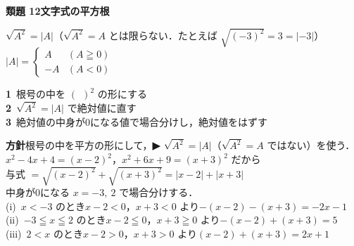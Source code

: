 \documentclass[a4paper,11pt]{ltjsarticle}
\newcommand{\ans}[2]{\Needspace{5\baselineskip}\vspace{6pt}%
  {\sffamily\bfseries 類題 #1\quad #2}\par}
\newcommand{\point}[1]{\textsf{\bfseries ▶ #1}}
\begin{document}
\ans{12}{文字式の平方根}
\begin{kai}
\begin{kakunin}
$\sqrt{A^2}=|A|$\quad（$\sqrt{A^2}=A$ とは限らない．たとえば $\sqrt{(-3)^2}=3=|-3|$）\\
$|A|=\begin{cases}A & (A\geqq0)\\ -A & (A<0)\end{cases}$
\end{kakunin}
\begin{steps}
\textbf{1}\ 根号の中を $(\ \ )^2$ の形にする\\
\textbf{2}\ $\sqrt{A^2}=|A|$ で絶対値に直す\\
\textbf{3}\ 絶対値の中身が0になる値で場合分けし，絶対値をはずす
\end{steps}
\textbf{方針}\quad 根号の中を平方の形にして，\point{$\sqrt{A^2}=|A|$}（$\sqrt{A^2}=A$ ではない）を使う．\\[2pt]
$x^2-4x+4=(x-2)^2$，$x^2+6x+9=(x+3)^2$ だから\\
\hspace*{1.5em}与式 $=\sqrt{(x-2)^2}+\sqrt{(x+3)^2}=|x-2|+|x+3|$\\
中身が0になる $x=-3,\ 2$ で場合分けする．\\[2pt]
(i)\ $x<-3$ のとき\quad $x-2<0$，$x+3<0$ より\quad $-(x-2)-(x+3)=-2x-1$\\
(ii)\ $-3\leqq x\leqq2$ のとき\quad $x-2\leqq0$，$x+3\geqq0$ より\quad $-(x-2)+(x+3)=5$\\
(iii)\ $2<x$ のとき\quad $x-2>0$，$x+3>0$ より\quad $(x-2)+(x+3)=2x+1$
\end{kai}
\end{document}
